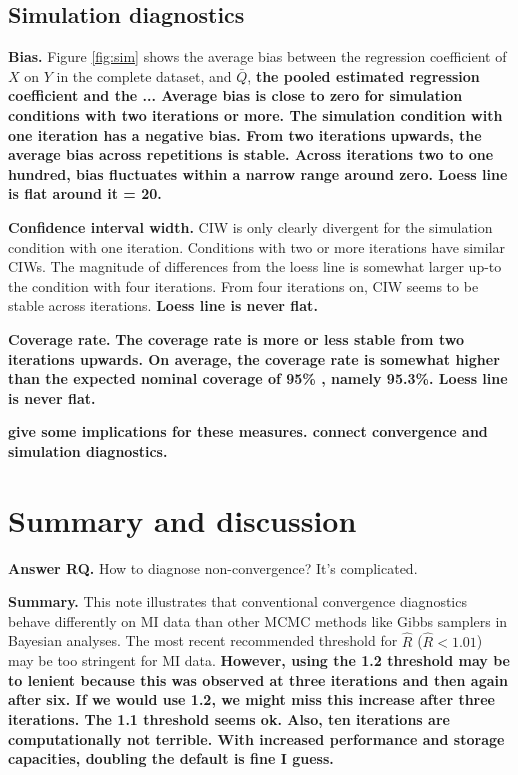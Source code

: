 \documentclass[article]{jss}
\begin{document}
\subsection{Simulation diagnostics}
\textbf{Bias.} Figure \ref{fig:sim} shows the average bias between the regression coefficient of $X$ on $Y$ in the complete dataset, and $\bar{Q}$, \textbf{the pooled estimated regression coefficient and the ... Average bias is close to zero for simulation conditions with two iterations or more. The simulation condition with one iteration has a negative bias. From two iterations upwards, the average bias across repetitions is stable. Across iterations two to one hundred, bias fluctuates within a narrow range around zero. Loess line is flat around it = 20.} 

\textbf{Confidence interval width.} CIW is only clearly divergent for the simulation condition with one iteration. Conditions with two or more iterations have similar CIWs. The magnitude of differences from the loess line is somewhat larger up-to the condition with four iterations. From four iterations on, CIW seems to be stable across iterations. \textbf{Loess line is never flat.}%

\textbf{Coverage rate.} \textbf{The coverage rate is more or less stable from two iterations upwards. On average, the coverage rate is somewhat higher than the expected nominal coverage of 95\% \cite{neym34}, namely 95.3\%. Loess line is never flat.}

\textbf{give some implications for these measures. connect convergence and simulation diagnostics.}


\section{Summary and discussion} \label{sec:summary}

\textbf{Answer RQ.} How to diagnose non-convergence? It's complicated.

\textbf{Summary.}
This note illustrates that conventional convergence diagnostics behave differently on MI data than other MCMC methods like Gibbs samplers in Bayesian analyses. The most recent recommended threshold for $\widehat{R}$ ($\widehat{R} < 1.01$) may be too stringent for MI data. \textbf{However, using the 1.2 threshold may be to lenient because this was observed at three iterations and then again after six. If we would use 1.2, we might miss this increase after three iterations. The 1.1 threshold seems ok. Also, ten iterations are computationally not terrible. With increased performance and storage capacities, doubling the default is fine I guess.}
\end{document}
